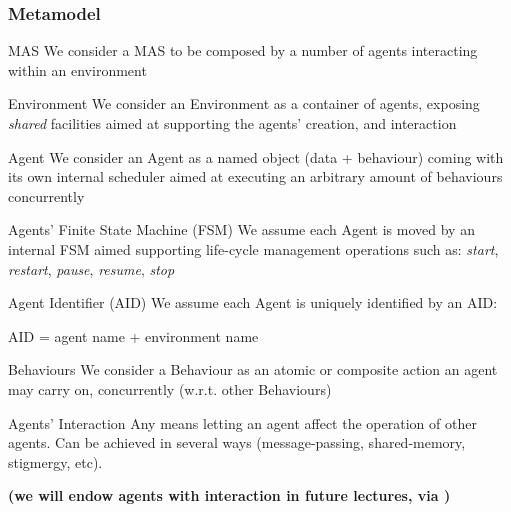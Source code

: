 \documentclass[presentation]{beamer}\mode<presentation>{\usetheme{AMSCesenaPurpleAndGold}}
\begin{document}
\begin{frame}[allowframebreaks]
\frametitle{Metamodel}

	\begin{block}{MAS}
	    We consider a MAS to be composed by a number of agents \alert{interacting} within an environment
	\end{block}

	\bigskip
	
	\begin{block}{Environment}
		We consider an Environment as a container of agents, exposing \emph{shared} facilities aimed at \alert{supporting} the agents' \alert{creation}, and \alert{interaction}
	\end{block}
	
	\bigskip
	
	\begin{block}{Agent}
	    We consider an Agent as a \alert{named} object (data + behaviour) coming with its own \alert{internal scheduler} aimed at executing an arbitrary amount of \alert{behaviours} concurrently
	\end{block}
	
	\bigskip
	
	\begin{block}{Agents' Finite State Machine (FSM)}
		We assume each Agent is moved by an internal FSM aimed supporting life-cycle management operations such as: \emph{start}, \emph{restart}, \emph{pause}, \emph{resume}, \emph{stop}	
	\end{block}

	\bigskip
	
	\begin{block}{Agent Identifier (AID)}
		We assume each Agent is uniquely identified by an AID:
		\begin{center}
			AID = agent name + environment name
		\end{center}
	\end{block}
	
	\bigskip
	
	\begin{block}{Behaviours}
		We consider a Behaviour as an atomic or composite action an agent may carry on, concurrently (w.r.t. other Behaviours)
	\end{block}
	
	\bigskip
	
	\begin{block}{Agents' Interaction}
		Any means letting an agent affect the operation of other agents.
		Can be achieved in several ways (message-passing, shared-memory, stigmergy, etc).
		\begin{center}\bfseries
			(we will endow agents with interaction in future lectures, via \linda{})
		\end{center}
	\end{block}

\end{frame}
\end{document}

